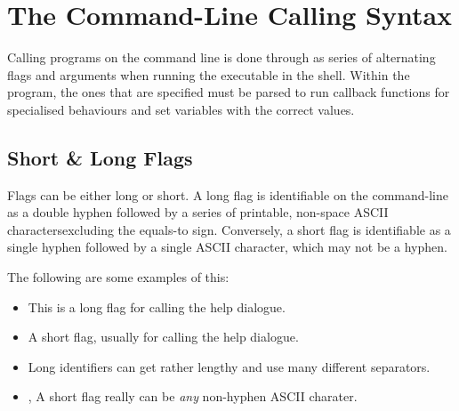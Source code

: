 %
%
%

\section{The Command-Line Calling Syntax}

Calling programs on the command line is done through as series of alternating flags and arguments when running the executable in the shell. Within the program, the ones that are specified must be parsed to run callback functions for specialised behaviours and set variables with the correct values.

\subsection{Short \& Long Flags}

Flags can be either long or short. A long flag is identifiable on the command-line as a double hyphen followed by a series of printable, non-space ASCII characters\footnotemark excluding the equals-to sign. Conversely, a short flag is identifiable as a single hyphen followed by a single ASCII character, which may not be a hyphen.

The following are some examples of this:
\begin{itemize}
	\item {} This is a long flag for calling the help dialogue.
	\item {} A short flag, usually for calling the help dialogue.
	\item {} Long identifiers can get rather lengthy and use many different separators.
	\item {},  A short flag really can be \emph{any} non-hyphen ASCII charater.
\end{itemize}

